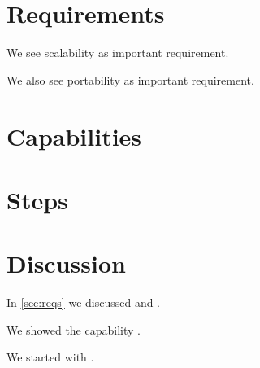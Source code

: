 \documentclass{article}
\begin{document}



\section{Requirements}
\label{sec:reqs}
We see scalability as important requirement.

We also see portability as important requirement.

\section{Capabilities}

\section{Steps}


\section{Discussion}
In \autoref{sec:reqs} we discussed  and .

We showed the capability .

We started with .
\end{document}
